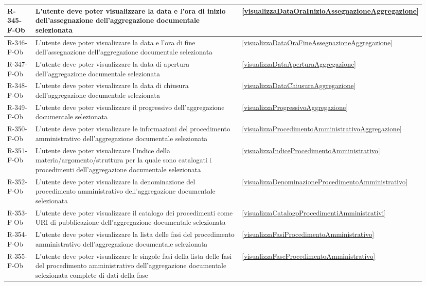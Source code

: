 \begin{longtable}{|p{2.5cm}|p{9.5cm}|p{2.5cm}|}
\hline
R-345-F-Ob & L'utente deve poter visualizzare la data e l'ora di inizio dell'assegnazione dell'aggregazione documentale selezionata & \ref{visualizzaDataOraInizioAssegnazioneAggregazione} \\
\hline
R-346-F-Ob & L'utente deve poter visualizzare la data e l'ora di fine dell'assegnazione dell'aggregazione documentale selezionata & \ref{visualizzaDataOraFineAssegnazioneAggregazione} \\
\hline
R-347-F-Ob & L'utente deve poter visualizzare la data di apertura dell'aggregazione documentale selezionata & \ref{visualizzaDataAperturaAggregazione} \\
\hline
R-348-F-Ob & L'utente deve poter visualizzare la data di chiusura dell'aggregazione documentale selezionata & \ref{visualizzaDataChiusuraAggregazione} \\
\hline
R-349-F-Ob & L'utente deve poter visualizzare il progressivo dell'aggregazione documentale selezionata & \ref{visualizzaProgressivoAggregazione} \\
\hline
R-350-F-Ob & L'utente deve poter visualizzare le informazioni del procedimento amministrativo dell'aggregazione documentale selezionata & \ref{visualizzaProcedimentoAmministrativoAggregazione} \\
\hline
R-351-F-Ob & L'utente deve poter visualizzare l'indice della materia/argomento/struttura per la quale sono catalogati i procedimenti dell'aggregazione documentale selezionata & \ref{visualizzaIndiceProcedimentoAmministrativo} \\
\hline
R-352-F-Ob & L'utente deve poter visualizzare la denominazione del procedimento amministrativo dell'aggregazione documentale selezionata & \ref{visualizzaDenominazioneProcedimentoAmministrativo} \\
\hline
R-353-F-Ob & L'utente deve poter visualizzare il catalogo dei procedimenti come URI di pubblicazione dell'aggregazione documentale selezionata & \ref{visualizzaCatalogoProcedimentiAmministrativi} \\
\hline
R-354-F-Ob & L'utente deve poter visualizzare la lista delle fasi del procedimento amministrativo dell'aggregazione documentale selezionata & \ref{visualizzaFasiProcedimentoAmministrativo} \\
\hline
R-355-F-Ob & L'utente deve poter visualizzare le singole fasi della lista delle fasi del procedimento amministrativo dell'aggregazione documentale selezionata complete di dati della fase & \ref{visualizzaFaseProcedimentoAmministrativo} \\

\end{longtable}
